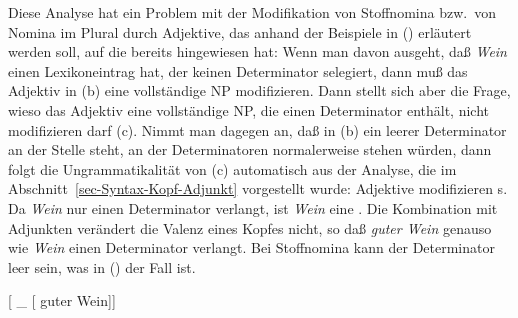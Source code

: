 Diese Analyse hat ein Problem mit der Modifikation von Stoffnomina bzw.\ von Nomina im Plural durch
Adjektive, das anhand der Beispiele in () erläutert werden soll, auf die bereits \citet[]{Netter94} hingewiesen hat:
\eal
{}
\zl 
Wenn man davon ausgeht, daß \emph{Wein} einen Lexikoneintrag hat, der keinen Determinator selegiert,
dann muß das Adjektiv in (b) eine vollständige NP modifizieren. Dann stellt sich aber die
Frage, wieso das Adjektiv eine vollständige NP, die einen Determinator enthält, nicht modifizieren
darf (c). Nimmt man dagegen an, daß in (b) ein leerer Determinator an der Stelle
steht, an der Determinatoren normalerweise stehen würden, dann folgt die Ungrammatikalität von
(c) automatisch aus der Analyse, die im Abschnitt~\ref{sec-Syntax-Kopf-Adjunkt} vorgestellt
wurde: Adjektive modifizieren \nbar{}s. Da \emph{Wein} nur einen Determinator verlangt, ist \emph{Wein} eine
\nbar. Die Kombination mit Adjunkten verändert die Valenz eines Kopfes nicht, so daß \emph{guter
  Wein} genauso wie \emph{Wein} einen Determinator verlangt. Bei Stoffnomina kann der Determinator
leer sein, was in () der Fall ist. 


\ea
{}[ \_ [\sub{\nbar} guter Wein]]
\z

